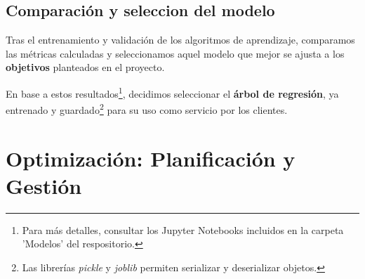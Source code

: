 \subsection{Comparación y seleccion del modelo}

Tras el entrenamiento y validación de los algoritmos de aprendizaje, comparamos las métricas calculadas y seleccionamos aquel modelo que mejor se ajusta a los \textbf{objetivos} planteados en el proyecto.


En base a estos resultados\footnote{Para más detalles, consultar los Jupyter Notebooks incluidos en la carpeta 'Modelos' del respositorio.}, decidimos seleccionar el \textbf{árbol de regresión}, ya entrenado y guardado\footnote{Las librerías \textit{pickle} y \textit{joblib} permiten serializar y deserializar objetos.} para su uso como servicio por los clientes.



\newpage

\section{Optimización: Planificación y Gestión}






 